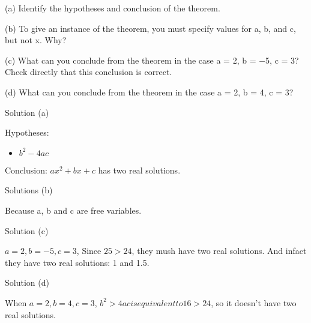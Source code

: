 \documentclass{article}
\begin{document}
(a) Identify the hypotheses and conclusion of the theorem.

(b) To give an instance of the theorem, you must specify values for a, b,
and c, but not x. Why?

(c) What can you conclude from the theorem in the case a = 2, b = −5,
c = 3? Check directly that this conclusion is correct.

(d) What can you conclude from the theorem in the case a = 2, b = 4, c
= 3?

Solution (a)

Hypotheses:
\begin{itemize}
\item $b^2 - 4ac$
\end{itemize}

Conclusion: $ax^2 + bx + c$ has two real solutions.

Solutions (b)

Because a, b and c are free variables.

Solution (c)

$a = 2, b = -5, c=3$, Since $25 > 24$, they mush have two real
solutions. And infact they have two real solutions: 1 and 1.5.

Solution (d)

When $a =2, b=4, c=3$, $b^2 > 4ac is equivalent to 16 > 24$, so it
doesn't have two real solutions.
\end{document}
